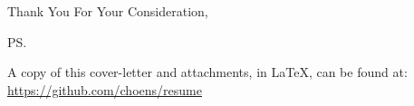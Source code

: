 \documentclass{letter}
\begin{document}
\begin{letter}{}
\closing{Thank You For Your Consideration,}

\ps


A copy of this cover-letter and attachments, in \LaTeX, can be found at: \\
\underline{https://github.com/choens/resume}

\end{letter}
\end{document}
